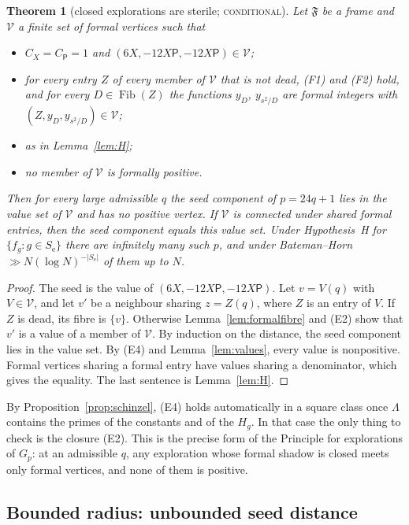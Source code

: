\documentclass[11pt,reqno]{amsart}
\newtheorem{theorem}{Theorem}[section]
\theoremstyle{definition}
\newcommand{\Pp}{\mathsf P}
\newcommand{\cV}{\mathcal V}
\newcommand{\cF}{\mathfrak F}
\newcommand{\Se}{S_{\mathrm e}}
\newcommand{\Fib}{\operatorname{Fib}}
\newcommand{\status}[1]{\textsc{#1}}
\begin{document}
\begin{theorem}[closed explorations are sterile; \status{conditional}]\label{thm:closed}
Let $\cF$ be a frame and $\cV$ a finite set of formal vertices such that
\begin{itemize}
\item[(E1)] $C_X=C_\Pp=1$ and $(6X,-12X\Pp,-12X\Pp)\in\cV$;
\item[(E2)] for every entry $Z$ of every member of $\cV$ that is not dead,
(F1) and (F2) hold, and for every $D\in\Fib(Z)$ the functions $y_D$,
$y_{s^2/D}$ are formal integers with $(Z,y_D,y_{s^2/D})\in\cV$;
\item[(E3)] as in Lemma~\ref{lem:H};
\item[(E4)] no member of $\cV$ is formally positive.
\end{itemize}
Then for every large admissible $q$ the seed component of $p=24q+1$ lies in
the value set of $\cV$ and has no positive vertex.  If $\cV$ is connected
under shared formal entries, then the seed component \emph{equals} this
value set.  Under Hypothesis~H for $\{f_g:g\in\Se\}$ there are
infinitely many such $p$, and under Bateman--Horn
$\gg N(\log N)^{-|\Se|}$ of them up to $N$.
\end{theorem}

\begin{proof}
The seed is the value of $(6X,-12X\Pp,-12X\Pp)$.  Let $v=V(q)$ with
$V\in\cV$, and let $v'$ be a neighbour sharing $z=Z(q)$, where $Z$ is an
entry of $V$.  If $Z$ is dead, its fibre is $\{v\}$.  Otherwise
Lemma~\ref{lem:formalfibre} and (E2) show that $v'$ is a value of a member
of $\cV$.  By induction on the distance, the seed component lies in the
value set.  By (E4) and Lemma~\ref{lem:values}, every value is nonpositive.
Formal vertices sharing a formal entry have values sharing a denominator,
which gives the equality.  The last sentence is Lemma~\ref{lem:H}.
\end{proof}

By Proposition~\ref{prop:schinzel}, (E4) holds automatically in a square
class once $\Lambda$ contains the primes of the constants and of the $H_g$.
In that case the only thing to check is the closure (E2).  This is the
precise form of the Principle for explorations of $G_p$: at an admissible
$q$, any exploration whose formal shadow is closed meets only formal
vertices, and none of them is positive.

\subsection{Bounded radius: unbounded seed distance}
\end{document}
